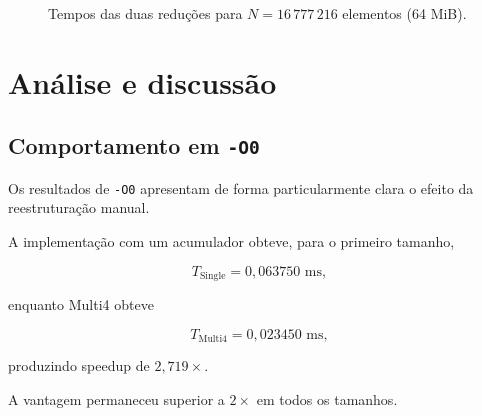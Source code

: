 \begin{figure}[htbp]
\centering


\caption{Tempos das duas reduções para \(N=16\,777\,216\) elementos (64 MiB).}
\label{fig:atvd02-maior-n}
\end{figure}


\section{Análise e discussão}

\label{sec:atvd02-discussao}

\subsection{Comportamento em \texttt{-O0}}

Os resultados de \texttt{-O0} apresentam de forma particularmente clara o efeito da
reestruturação manual.

A implementação com um acumulador obteve, para o primeiro tamanho,

\begin{equation}
T_{\text{Single}}=0{,}063750\text{ ms},
\end{equation}

enquanto Multi4 obteve

\begin{equation}
T_{\text{Multi4}}=0{,}023450\text{ ms},
\end{equation}

produzindo speedup de \(2{,}719\times\).

A vantagem permaneceu superior a \(2\times\) em todos os tamanhos.

